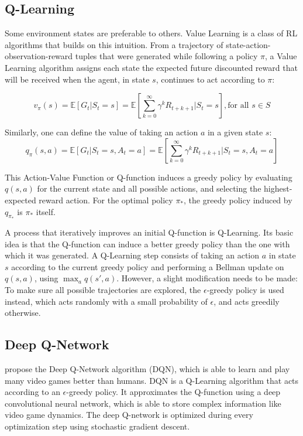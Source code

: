 \subsection{Q-Learning}
Some environment states are preferable to others.
Value Learning is a class of RL algorithms that builds on this intuition.
From a trajectory of state-action-observation-reward tuples that were generated while following a policy $\pi$, a Value Learning algorithm assigns each state the expected future discounted reward that will be received when the agent, in state $s$, continues to act according to $\pi$:

$$v_\pi(s) = \mathbb{E}[G_t | S_t=s] = \mathbb{E}[\sum_{k=0}^{\infty}\gamma^kR_{t+k+1} | S_t = s], \text{for all } s \in S$$

Similarly, one can define the value of taking an action $a$ in a given state $s$:
\begin{equation} \label{eq:qfunction}
    q_\pi(s,a) = \mathbb{E}[G_t | S_t=s, A_t = a] = \mathbb{E}[\sum_{k=0}^{\infty}\gamma^kR_{t+k+1} | S_t = s, A_t = a]
\end{equation}

This Action-Value Function or Q-function induces a greedy policy by evaluating $q(s,a)$ for the current state and all possible actions, and selecting the highest-expected reward action.
For the optimal policy $\pi_*$, the greedy policy induced by $q_{\pi_*}$ is $\pi_*$ itself.

A process that iteratively improves an initial Q-function is Q-Learning.
Its basic idea is that the Q-function can induce a better greedy policy than the one with which it was generated.
A Q-Learning step consists of taking an action $a$ in state $s$ according to the current greedy policy and performing a Bellman update on $q(s,a)$, using $\max_a{q(s',a)}$.
However, a slight modification needs to be made: To make sure all possible trajectories are explored, the $\epsilon$-greedy policy is used instead, which acts randomly with a small probability of $\epsilon$, and acts greedily otherwise.


\subsection{Deep Q-Network}
\cite{mnih2015HumanlevelControlDeep} propose the Deep Q-Network algorithm (DQN), which is able to learn and play many video games better than humans.
DQN is a Q-Learning algorithm that acts according to an $\epsilon$-greedy policy.
It approximates the Q-function using a deep convolutional neural network, which is able to store complex information like video game dynamics.
The deep Q-network is optimized during every optimization step using stochastic gradient descent.

